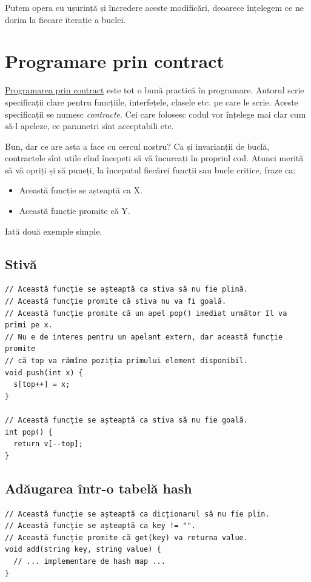 \documentclass[../main.tex]{subfiles}
\begin{document}
Putem opera cu ușurință și încredere aceste modificări, deoarece înțelegem ce ne dorim la fiecare iterație a buclei.


\section{Programare prin contract}

\href{https://en.wikipedia.org/wiki/Design_by_contract}{Programarea prin contract} este tot o bună practică în programare. Autorul scrie specificații clare pentru funcțiile, interfețele, clasele etc. pe care le scrie. Aceste specificații se numesc \textit{contracte}. Cei care folosesc codul vor înțelege mai clar cum să-l apeleze, ce parametri sînt acceptabili etc.

Bun, dar ce are asta a face cu cercul nostru? Ca și invarianții de buclă, contractele sînt utile cînd începeți să vă încurcați în propriul cod. Atunci merită să vă opriți și să puneți, la începutul fiecărei funcții sau bucle critice, fraze ca:

\begin{itemize}
  \item Această funcție se așteaptă ca X.
  \item Această funcție promite că Y.
\end{itemize}

Iată două exemple simple.


\subsection{Stivă}

\begin{verbatim}
// Această funcție se așteaptă ca stiva să nu fie plină.
// Această funcție promite că stiva nu va fi goală.
// Această funcție promite că un apel pop() imediat următor îl va primi pe x.
// Nu e de interes pentru un apelant extern, dar această funcție promite
// că top va rămîne poziția primului element disponibil.
void push(int x) {
  s[top++] = x;
}

// Această funcție se așteaptă ca stiva să nu fie goală.
int pop() {
  return v[--top];
}
\end{verbatim}


\subsection{Adăugarea într-o tabelă hash}

\begin{verbatim}
// Această funcție se așteaptă ca dicționarul să nu fie plin.
// Această funcție se așteaptă ca key != "".
// Această funcție promite că get(key) va returna value.
void add(string key, string value) {
  // ... implementare de hash map ...
}
\end{verbatim}
\end{document}
